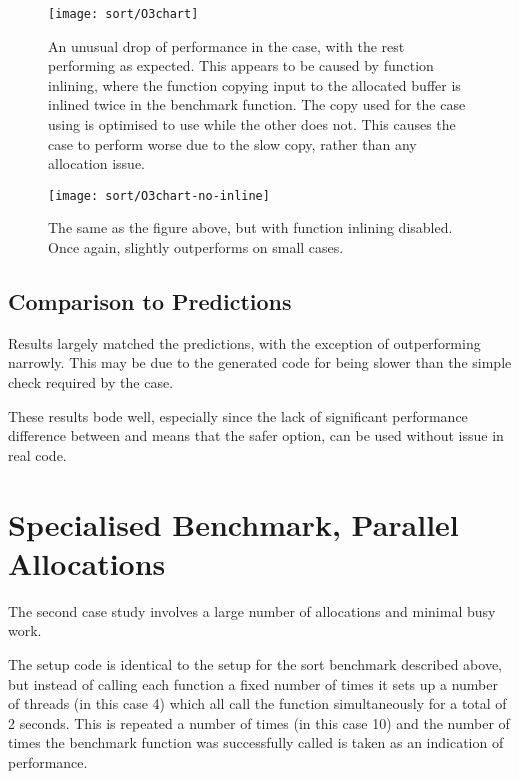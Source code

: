 \begin{figure}[ph]
	\centering
	\texttt{[image: sort/O3chart]}
	\caption{An unusual drop of performance in the  case, with the rest performing as expected. This appears to be caused by function inlining, where the function copying input to the allocated buffer is inlined twice in the  benchmark function. The copy used for the case using \malloc{} is optimised to use  while the other does not. This causes the  case to perform worse due to the slow copy, rather than any allocation issue.}
\end{figure}

\begin{figure}[ph]
	\centering
	\texttt{[image: sort/O3chart-no-inline]}
	\caption{The same as the figure above, but with function inlining disabled. Once again,  slightly outperforms  on small cases.}\label{lastsort}
\end{figure}

\subsection{Comparison to Predictions}

Results largely matched the predictions, with the exception of  outperforming  narrowly. This may be due to the generated code for  being slower than the simple check required by the  case.

These results bode well, especially since the lack of significant performance difference between  and  means that the safer option,  can be used without issue in real code.

\pagebreak

\section{Specialised Benchmark, Parallel Allocations}

The second case study involves a large number of allocations and minimal busy work.

The setup code is identical to the setup for the sort benchmark described above, but instead of calling each function a fixed number of times it sets up a number of threads (in this case 4) which all call the function simultaneously for a total of 2 seconds. This is repeated a number of times (in this case 10) and the number of times the benchmark function was successfully called is taken as an indication of performance.

